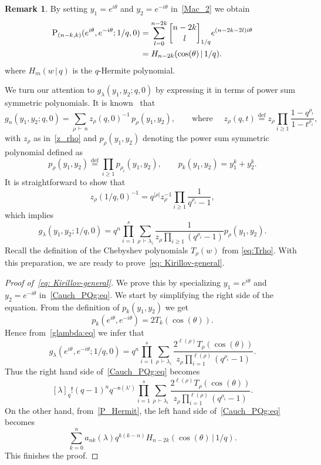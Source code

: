 \documentclass[12pt,a4paper,reqno]{amsart}
\theoremstyle{plain}
\theoremstyle{definition}
\newtheorem{remark}[theorem]{Remark}
\newcommand{\defin}{\overset{\mathrm{def}}{=}}
\newcommand{\1}{\mathds{1}}
\renewcommand{\P}{\mathrm{P}}
\newcommand{\fn}{\mathsf{n}}
\begin{document}
\begin{remark} By setting $y_1=e^{i\theta}$ and $y_2=e^{-i\theta}$ in~\cref{Mac_2} we obtain
\begin{align}
\label{P_Hermit}
\P_{(n-k,k)}(e^{i\theta},e^{-i\theta};1/q,0)&=\sum_{l=0}^{n-2k}{n-2k \brack l}_{1/q}e^{(n-2k-2l)i\theta}\\
&=H_{n-2k}(\cos(\theta)\, |\, 1/q).
\notag
\end{align}
where $H_m(w\, |\, q)$ is the $q$-Hermite polynomial. 
\end{remark}

We turn our attention to $g_\lambda(y_1,y_2;q,0)$ by expressing it in terms of power sum symmetric polynomials. It is known~\cite[p. 311, Eq. (2.9)]{Macdonald} that  
\begin{equation*}
    g_n(y_1,y_2; q, 0) = \sum_{\rho \,\vdash\, n} z_\rho(q,0)^{-1} \, p_\rho(y_1,y_2),\qquad 
    \text{where }\quad z_\rho(q, t)\defin z_\rho \prod_{i \geq 1} \frac{1 - q^{\rho_i}}{1 - t^{\rho_i}},
\end{equation*}
with $z_\rho$ as in~\cref{z_rho} and $p_\rho(y_1,y_2)$ denoting the power sum symmetric polynomial defined as  
\[
p_\rho(y_1,y_2) \defin \prod_{i \geq 1} p_{\rho_i}(y_1,y_2), \qquad p_k(y_1,y_2) = y_1^k + y_2^k.
\]
It is straightforward to show that 
$$
z_\rho(1/q,0)^{-1}=q^{|\rho|}z_\rho^{-1}\prod_{i\geq 1}\frac{1}{q^{\rho_i}-1},
$$
which implies
\begin{equation}\label{glambda:eq}
    g_\lambda(y_1,y_2; 1/q,0)=q^n\prod_{i=1}^s\sum_{\rho\, \vdash \lambda_i}\frac{1}{z_\rho\prod_{i\geq 1}(q^{\rho_i}-1)}p_\rho(y_1,y_2).
\end{equation}
Recall the definition of 
the Chebyshev polynomials
$T_{\rho}(w)$ from
\cref{eq:Trho}.
With this preparation, we are ready to prove~\cref{eq: Kirillov-general}.
\begin{proof}[Proof of~\cref{eq: Kirillov-general}] We prove this by specializing $y_1=e^{i\theta}$ and $y_2=e^{-i\theta}$ in~\cref{Cauch_PQg:eq}. We start by simplifying the right side of the equation. From the definition of $p_k(y_1,y_2)$ we get $$p_k\left(e^{i\theta},e^{-i\theta}\right)=2T_k(\cos(\theta)).$$
Hence from~\cref{glambda:eq} we infer that
$$
g_\lambda\left(e^{i\theta},e^{-i\theta}; 1/q,0\right)=q^n\prod_{i=1}^s\sum_{\rho\, \vdash \lambda_i}\frac{2^{\ell(\rho)}T_{\rho}(\cos(\theta))}{z_\rho\prod_{i=1}^{\ell(\rho)}\left(q^{\rho_i}-1\right)}.
$$
Thus the right hand side of~\cref{Cauch_PQg:eq} becomes
$$
[\lambda]_q! (q-1)^nq^{-\fn(\lambda')}\prod_{i=1}^s\sum_{\rho\, \vdash \lambda_i}\frac{2^{\ell(\rho)}T_{\rho}(\cos(\theta))}{z_\rho\prod_{i=1}^{\ell(\rho)}\left(q^{\rho_i}-1\right)}.
$$
On the other hand, from~\cref{P_Hermit}, the left hand side of~\cref{Cauch_PQg:eq} becomes
$$
\sum_{k=0}^n a_{nk}(\lambda)q^{k(k-n)}H_{n-2k}(\cos(\theta)\,|\, 1/q).
$$
This finishes the proof. 
\end{proof}
\end{document}
